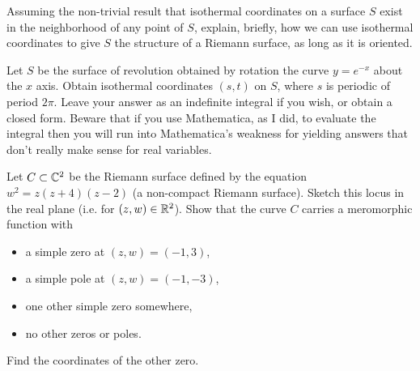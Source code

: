 \documentclass{lkx_pset}
\begin{document}
\begin{parts}
	\begin{part}{}
		Assuming the non-trivial
		result that isothermal coordinates on a surface $S$ exist in the
		neighborhood of any point of $S$, explain, briefly, how we
		can use isothermal coordinates to give $S$ the structure of a Riemann
		surface, as long as it is oriented.
	\end{part}

	\begin{part}{}
		Let $S$ be the surface of revolution obtained by rotation the curve
		$y=e^{-x}$ about the $x$ axis. Obtain isothermal
		coordinates $(s,t)$ on $S$, where $s$ is periodic of period $2\pi$.
		Leave your answer as an indefinite integral if you wish, or obtain a
		closed form. Beware that if you use Mathematica, as I did, to evaluate
		the integral then you will run into Mathematica's weakness for
		yielding answers that don't really make sense for real variables.
	\end{part}
\end{parts}

\begin{problem}{3}
Let $C\subset \mathbb{C}^{2}$ be the Riemann surface defined by the
equation $w^{2}=z(z+4)(z-2)$ (a non-compact Riemann surface).
Sketch this locus in the real plane (i.e. for $(z,w) \in \mathbb{R}^{2}$).
Show that the curve $C$ carries a meromorphic function with
\begin{itemize}
	\item a simple zero at $(z,w)=(-1,3)$,
	\item a simple pole at
	      $(z,w)=(-1,-3)$,
	\item one other simple zero somewhere,
	\item no other zeros or poles.
\end{itemize}
Find the coordinates of the other zero.

\end{problem}
\end{document}
